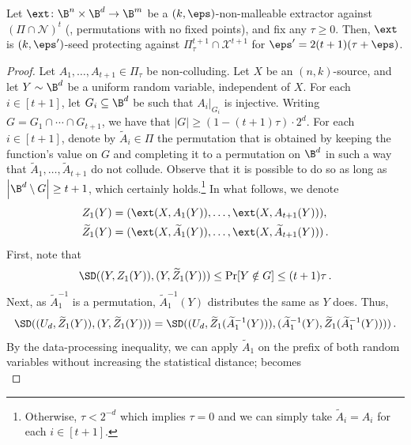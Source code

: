\begin{lemma}\label{lem:nm-to-sp}
Let $\ext \colon \B^{n} \times \B^{d} \rightarrow \B^{m}$ be a $(k,\eps)$-non-malleable extractor
against $\left( \Pi \cap \mathcal{N} \right)^t$ (\ie, permutations with no fixed points), and fix any $\tau \ge 0$. Then, $\ext$ is $(k,\eps')$-seed protecting against $\Pi^{t+1}_{\tau}  \cap \mathcal{X}^{t+1}$ for
$\eps' = 2(t+1)(\tau+\eps)$.
\end{lemma}
\begin{proof}
Let $A_1,\ldots,A_{t+1} \in \Pi_{\tau}$ be non-colluding. Let $X$ be an $(n,k)$-source, and let $Y \sim \B^{d}$ be 
a uniform random variable, independent of $X$. 
For each $i \in [t+1]$, let $G_i \subseteq \B^{d}$ be such that $A_{i}|_{G_i}$ is injective.
Writing $G = G_{1} \cap \cdots \cap G_{t+1}$, we have that $|G| \ge (1-(t+1)\tau) \cdot 2^{d}$.
%
For each $i \in [t+1]$, denote by $\widetilde{A}_{i} \in \Pi$ the permutation that is obtained by
keeping the function's value on $G$ and completing it to a permutation on $\B^d$ in such a way
that $\widetilde{A}_1,\ldots,\widetilde{A}_{t+1}$ do not collude. Observe that it is possible to do so as long as
$\left|\B^{d} \setminus G\right| \ge t+1$, which certainly holds.\footnote{Otherwise,
$\tau < 2^{-d}$ which implies $\tau = 0$ and we can simply take $\widetilde{A}_i = A_i$
for each $i \in [t+1]$.} 
%
In what follows, we denote
\begin{align*}
Z_1(Y) &= ( \ext(X,A_{1}(Y)),\ldots,\ext(X,A_{t+1}(Y)) ),\\
\widetilde{Z}_1(Y) &= ( \ext(X,\widetilde{A}_{1}(Y)),\ldots,\ext(X,\widetilde{A}_{t+1}(Y)) )\,.
\end{align*}
First, note that
\begin{equation}\label{eq:sec41}
\SD((Y,Z_1(Y)),(Y,\widetilde{Z}_1(Y))) \le \Pr[Y \notin G] \le (t+1)\tau\,.
\end{equation}
Next, as $\widetilde{A}_{1}^{-1}$ is a permutation, $\widetilde{A}_{1}^{-1}(Y)$  distributes the same as $Y$ does. Thus,
\begin{equation}\label{eq:sec42}
\SD((U_d,\widetilde{Z}_1(Y)),(Y,\widetilde{Z}_1(Y))) = 
\SD((U_d,\widetilde{Z}_1(\widetilde{A}_{1}^{-1}(Y))),(\widetilde{A}_{1}^{-1}(Y),\widetilde{Z}_1(\widetilde{A}_{1}^{-1}(Y))))\,.
\end{equation}
By the data-processing inequality,
we can apply $\widetilde{A}_1$ on the prefix of both random variables without increasing
the statistical distance;  becomes
\begin{equation}\label{eq:sec423}

\end{equation}
\end{proof}
